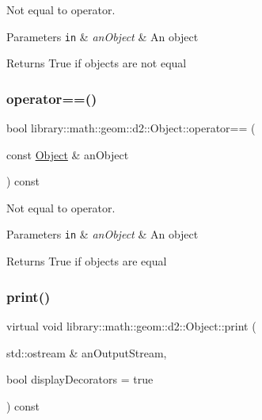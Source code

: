 Not equal to operator. 


\begin{DoxyParams}[1]{Parameters}
\mbox{\tt in}  & {\em an\+Object} & An object \\
\hline
\end{DoxyParams}
\begin{DoxyReturn}{Returns}
True if objects are not equal 
\end{DoxyReturn}
\mbox{\label{classlibrary_1_1math_1_1geom_1_1d2_1_1_object_a97aeb08c0dbe7f803188ae335f6b0e7a}} 
\subsubsection{\texorpdfstring{operator==()}{operator==()}}
{\footnotesize\ttfamily bool library\+::math\+::geom\+::d2\+::\+Object\+::operator== (\begin{DoxyParamCaption}\item[{const \hyperlink{classlibrary_1_1math_1_1geom_1_1d2_1_1_object}{Object} \&}]{an\+Object }\end{DoxyParamCaption}) const}



Not equal to operator. 


\begin{DoxyParams}[1]{Parameters}
\mbox{\tt in}  & {\em an\+Object} & An object \\
\hline
\end{DoxyParams}
\begin{DoxyReturn}{Returns}
True if objects are equal 
\end{DoxyReturn}
\mbox{\label{classlibrary_1_1math_1_1geom_1_1d2_1_1_object_a834bbf59cf1c483d1dc7b0966b1e1ab3}} 
\subsubsection{\texorpdfstring{print()}{print()}}
{\footnotesize\ttfamily virtual void library\+::math\+::geom\+::d2\+::\+Object\+::print (\begin{DoxyParamCaption}\item[{std\+::ostream \&}]{an\+Output\+Stream,  }\item[{bool}]{display\+Decorators = {\ttfamily true} }\end{DoxyParamCaption}) const\hspace{0.3cm}{\ttfamily [pure virtual]}}




